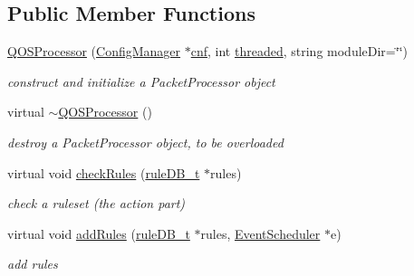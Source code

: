 \subsection*{Public Member Functions}
\begin{DoxyCompactItemize}
\item 
\hyperlink{classQOSProcessor_a27b56d900e42f99fea52c93e8a720bf5}{Q\+O\+S\+Processor} (\hyperlink{classConfigManager}{Config\+Manager} $\ast$\hyperlink{classQualityManagerComponent_a021f9991b72d52f295b87d8a5b02046a}{cnf}, int \hyperlink{classQualityManagerComponent_add2cffa903c310563f8b999cdecd1953}{threaded}, string module\+Dir=\char`\"{}\char`\"{})
\begin{DoxyCompactList}\small\item\em construct and initialize a Packet\+Processor object \end{DoxyCompactList}\item 
\mbox{\label{classQOSProcessor_a78d0a0c0dde203f9deb4120feae114c3}} 
virtual \hyperlink{classQOSProcessor_a78d0a0c0dde203f9deb4120feae114c3}{$\sim$\+Q\+O\+S\+Processor} ()
\begin{DoxyCompactList}\small\item\em destroy a Packet\+Processor object, to be overloaded \end{DoxyCompactList}\item 
\mbox{\label{classQOSProcessor_ab9b3ef050bdc595e6096baac0d466955}} 
virtual void \hyperlink{classQOSProcessor_ab9b3ef050bdc595e6096baac0d466955}{check\+Rules} (\hyperlink{RuleFileParser_8h_a7d5bb94bb17a8a1d92db2a89a0cc96d1}{rule\+D\+B\+\_\+t} $\ast$rules)
\begin{DoxyCompactList}\small\item\em check a ruleset (the action part) \end{DoxyCompactList}\item 
\mbox{\label{classQOSProcessor_a6370d2653a88ce6dc4df275b8279605e}} 
virtual void \hyperlink{classQOSProcessor_a6370d2653a88ce6dc4df275b8279605e}{add\+Rules} (\hyperlink{RuleFileParser_8h_a7d5bb94bb17a8a1d92db2a89a0cc96d1}{rule\+D\+B\+\_\+t} $\ast$rules, \hyperlink{classEventScheduler}{Event\+Scheduler} $\ast$e)
\begin{DoxyCompactList}\small\item\em add rules \end{DoxyCompactList}\item 

\end{DoxyCompactItemize}
